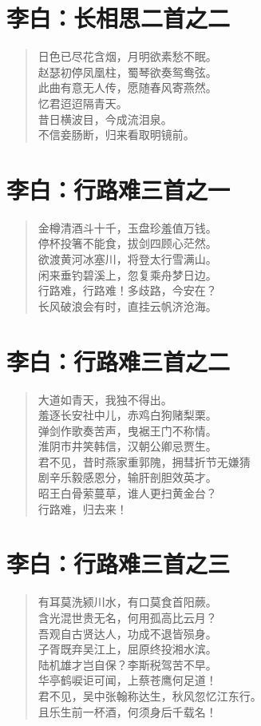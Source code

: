 \documentclass[12pt,oneside]{book}
\newenvironment{shici}{
\begin{verse}
\centering\large\hspace{12pt}}
{\end{verse}}
\begin{document}
\chapter{李白：长相思二首之二}
\begin{shici}
日色已尽花含烟，月明欲素愁不眠。\\
赵瑟初停凤凰柱，蜀琴欲奏鸳鸯弦。\\
此曲有意无人传，愿随春风寄燕然。\\
忆君迢迢隔青天。\\
昔日横波目，今成流泪泉。\\
不信妾肠断，归来看取明镜前。
\end{shici}

\chapter{李白：行路难三首之一}
\begin{shici}
金樽清酒斗十千，玉盘珍羞值万钱。\\
停杯投箸不能食，拔剑四顾心茫然。\\
欲渡黄河冰塞川，将登太行雪满山。\\
闲来垂钓碧溪上，忽复乘舟梦日边。\\
行路难，行路难！多歧路，今安在？\\
长风破浪会有时，直挂云帆济沧海。
\end{shici}


\chapter{李白：行路难三首之二}
\begin{shici}
大道如青天，我独不得出。\\
羞逐长安社中儿，赤鸡白狗赌梨栗。\\
弹剑作歌奏苦声，曳裾王门不称情。\\
淮阴市井笑韩信，汉朝公卿忌贾生。\\
君不见，昔时燕家重郭隗，拥彗折节无嫌猜\\
剧辛乐毅感恩分，输肝剖胆效英才。\\
昭王白骨萦蔓草，谁人更扫黄金台？\\
行路难，归去来！
\end{shici}


\chapter{李白：行路难三首之三}
\begin{shici}
有耳莫洗颍川水，有口莫食首阳蕨。\\
含光混世贵无名，何用孤高比云月？\\
吾观自古贤达人，功成不退皆殒身。\\
子胥既弃吴江上，屈原终投湘水滨。\\
陆机雄才岂自保？李斯税驾苦不早。\\
华亭鹤唳讵可闻，上蔡苍鹰何足道！\\
君不见，吴中张翰称达生，秋风忽忆江东行。\\
且乐生前一杯酒，何须身后千载名！
\end{shici}
\end{document}
